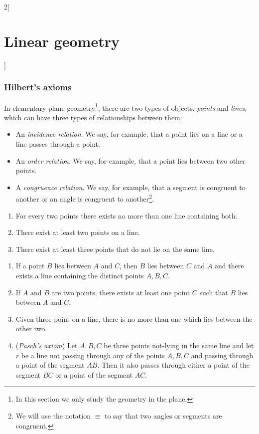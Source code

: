 \documentclass[../../../main.tex]{subfiles}
\begin{document}
\begin{multicols}{2}[\section{Linear geometry}]
  \subsubsection{Hilbert's axioms}
  \begin{definition}
    In elementary plane geometry\footnote{In this section we only study the geometry in the plane.}, there are two types of objects, \emph{points} and \emph{lines}, which can have three types of relationships between them:
    \begin{itemize}
      \item An \emph{incidence relation}. We say, for example, that a point lies on a line or a line passes through a point.
      \item An \emph{order relation}. We say, for example, that a point lies between two other points.
      \item A \emph{congruence relation}. We say, for example, that a segment is congruent to another or an angle is congruent to another\footnote{We will use the notation $\equiv$ to say that two angles or segments are congruent.}.
    \end{itemize}
  \end{definition}
  \begin{axiom}\label{LG_incidence}
    \hfill
    \begin{enumerate}
      \item For every two points there exists no more than one line containing both.
      \item There exist at least two points on a line.
      \item There exist at least three points that do not lie on the same line.
    \end{enumerate}
  \end{axiom}
  \begin{axiom}\label{LG_order}
    \hfill
    \begin{enumerate}
      \item If a point $B$ lies between $A$ and $C$, then $B$ lies between $C$ and $A$ and there exists a line containing the distinct points $A,B,C$.
      \item If $A$ and $B$ are two points, there exists at least one point $C$ such that $B$ lies between $A$ and $C$.
      \item Given three point on a line, there is no more than one which lies between the other two.
      \item (\emph{Pasch's axiom}) Let $A,B,C$ be three points not-lying in the same line and let $r$ be a line not passing through any of the points $A,B,C$ and passing through a point of the segment $AB$. Then it also passes through either a point of the segment $BC$ or a point of the segment $AC$.

\end{enumerate}
\end{axiom}
\end{multicols}
\end{document}
